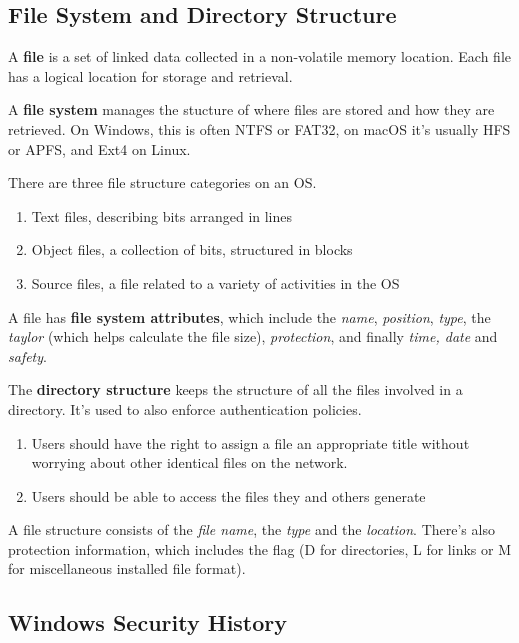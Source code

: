 \subsection{File System and Directory Structure}

A \textbf{file} is a set of linked data collected in a non-volatile memory location. Each file has a logical location for storage and retrieval.

A \textbf{file system} manages the stucture of where files are stored and how they are retrieved. On Windows, this is often NTFS or FAT32, on macOS it's usually HFS or APFS, and Ext4 on Linux.

There are three file structure categories on an OS.

\begin{enumerate}
    \item Text files, describing bits arranged in lines
    \item Object files, a collection of bits, structured in blocks
    \item Source files, a file related to a variety of activities in the OS
\end{enumerate}

A file has \textbf{file system attributes}, which include the \textit{name}, \textit{position}, \textit{type}, the \textit{taylor} (which helps calculate the file size), \textit{protection}, and finally \textit{time, date} and \textit{safety}. 

The \textbf{directory structure} keeps the structure of all the files involved in a directory. It's used to also enforce authentication policies.

\begin{enumerate}
    \item Users should have the right to assign a file an appropriate title without worrying about other identical files on the network.
    \item Users should be able to access the files they and others generate
\end{enumerate}

A file structure consists of the \textit{file name}, the \textit{type} and the \textit{location}. There's also protection information, which includes the flag (D for directories, L for links or M for miscellaneous installed file format).

\subsection{Windows Security History}

